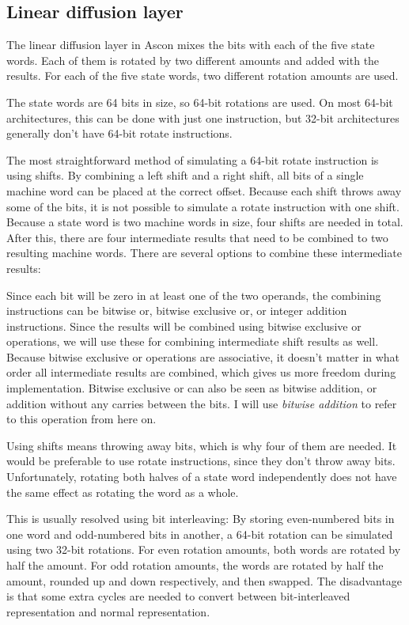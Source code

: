 \subsection{Linear diffusion layer}

The linear diffusion layer in Ascon mixes the bits with each of the five state
words. Each of them is rotated by two different amounts and added with the
results. For each of the five state words, two different rotation amounts are
used.

The state words are 64 bits in size, so 64-bit rotations are used. On most
64-bit architectures, this can be done with just one instruction, but 32-bit
architectures generally don't have 64-bit rotate instructions.

The most straightforward method of simulating a 64-bit rotate instruction is
using shifts. By combining a left shift and a right shift, all bits of a single
machine word can be placed at the correct offset. Because each shift throws
away some of the bits, it is not possible to simulate a rotate instruction with
one shift. Because a state word is two machine words in size, four shifts are
needed in total. After this, there are four intermediate results that need to be
combined to two resulting machine words. There are several options to combine
these intermediate results:

Since each bit will be zero in at least one of the two operands, the combining
instructions can be bitwise or, bitwise exclusive or, or integer addition
instructions. Since the results will be combined using bitwise exclusive or
operations, we will use these for combining intermediate shift results as well.
Because bitwise exclusive or operations are associative, it doesn't matter in
what order all intermediate results are combined, which gives us more freedom
during implementation. Bitwise exclusive or can also be seen as bitwise
addition, or addition without any carries between the bits. I will use
\emph{bitwise addition} to refer to this operation from here on.

Using shifts means throwing away bits, which is why four of them are needed. It
would be preferable to use rotate instructions, since they don't throw away
bits. Unfortunately, rotating both halves of a state word independently does not
have the same effect as rotating the word as a whole.

This is usually resolved using bit interleaving: By storing even-numbered bits
in one word and odd-numbered bits in another, a 64-bit rotation can be simulated
using two 32-bit rotations. For even rotation amounts, both words are rotated by
half the amount. For odd rotation amounts, the words are rotated by half the
amount, rounded up and down respectively, and then swapped. The disadvantage is
that some extra cycles are needed to convert between bit-interleaved
representation and normal representation.

